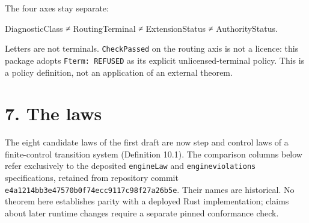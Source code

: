 \documentclass[
  11pt,
]{article}
\newenvironment{Shaded}{}{}
\newcommand{\NormalTok}[1]{#1}
\renewcommand{\_}{\ddcunderscore\allowbreak}
\begin{document}
The four axes stay separate:

\begin{Shaded}
\begin{Highlighting}[]
\NormalTok{DiagnosticClass ≠ RoutingTerminal ≠ ExtensionStatus ≠ AuthorityStatus.}
\end{Highlighting}
\end{Shaded}

Letters are not terminals. \texttt{Check\allowbreak Passed} on the routing axis is
not a licence: this package adopts \texttt{F\_term:\ REFUSED} as its
explicit unlicensed-terminal policy. This is a policy definition, not an
application of an external theorem.

\section{7. The laws}\label{the-laws}

The eight candidate laws of the first draft are now step and control
laws of a finite-control transition system (Definition 10.1). The
comparison columns below refer exclusively to the deposited
\texttt{engine\allowbreak Law} and \texttt{engine\_violations} specifications,
retained from repository commit
\texttt{e4a1214bb3e47570b0f74ecc9117c98f27a26b5e}. Their names are
historical. No theorem here establishes parity with a deployed Rust
implementation; claims about later runtime changes require a separate
pinned conformance check.
\end{document}
